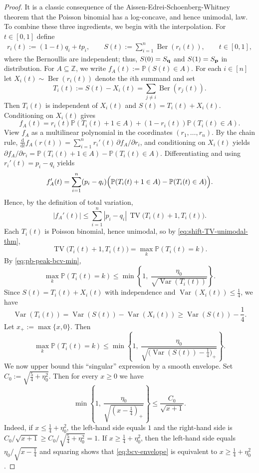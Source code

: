 \documentclass[11pt]{amsart}
\theoremstyle{plain}
\theoremstyle{definition}
\DeclareMathOperator{\TV}{TV}
\DeclareMathOperator{\Ber}{Ber}
\DeclareMathOperator{\Var}{Var}
\renewcommand{\P}{\mathbb{P}}
\newcommand{\beq}{\begin{eqnarray*}}
\newcommand{\eeq}{\end{eqnarray*}}
\newcommand{\etaBCV}{\eta_0}
\newcommand{\CBCV}{C_0}
\renewcommand{\vec}[1]{\textup{{\bf #1}}}
\begin{document}
\begin{proof}
It is a classic
consequence of
the Aissen-Edrei-Schoenberg-Whitney
theorem \cite[Section 4]{TangTang2023}
that the Poisson binomial
has a log-concave,
and hence unimodal, law.
To combine these three ingredients, we begin with the interpolation.
For $t\in[0,1]$ define
\beq
r_i(t):=(1-t)q_i+tp_i,
\qquad
S(t):=\sum_{i=1}^n \Ber(r_i(t)),
\qquad t\in[0,1],
\eeq
where the Bernoullis are independent;
thus, $S(0)=S_{\vec{q}}$ and $S(1)=S_{\vec{p}}$ in distribution.
For $A\subseteq\mathbb Z$,
we write $f_A(t):=\P(S(t)\in A)$.
For each $i\in[n]$ let $X_i(t)\sim\Ber(r_i(t))$ denote the $i$th summand and set
\[
T_i(t):=S(t)-X_i(t)=\sum_{j\ne i}\Ber(r_j(t)).
\]
Then $T_i(t)$ is independent of $X_i(t)$ and $S(t)=T_i(t)+X_i(t)$.
Conditioning on $X_i(t)$ gives
\[
f_A(t)=r_i(t)\P(T_i(t)+1\in A)+(1-r_i(t))\P(T_i(t)\in A).
\]
View $f_A$ as a multilinear polynomial in the coordinates $(r_1,\dots,r_n)$.
By the chain rule,
$\frac{\mathrm{d}}{\mathrm{d}t} f_A(r(t))=\sum_{i=1}^n r_i'(t)\,\partial f_A/\partial r_i$,
and conditioning on $X_i(t)$ yields
$\partial f_A/\partial r_i=\P(T_i(t)+1\in A)-\P(T_i(t)\in A)$.
Differentiating and using $r_i'(t)=p_i-q_i$ yields
\[
f_A'(t)=\sum_{i=1}^n (p_i-q_i)\Bigl(\P(T_i(t)+1\in A)-\P(T_i(t)\in A)\Bigr).
\]
Hence, by the definition of total variation,
\[
|f_A'(t)|
\le
\sum_{i=1}^n |p_i-q_i|\,
\TV\!\bigl(T_i(t)+1,T_i(t)\bigr)
.
\]
Each $T_i(t)$ is Poisson binomial, hence unimodal, so by
\eqref{eq:shift-TV-unimodal-thm},
\[
\TV\!\bigl(T_i(t)+1,T_i(t)\bigr)
=\max_k \P(T_i(t)=k).
\]
By \eqref{eq:pb-peak-bcv-min},
\[
\max_k \P(T_i(t)=k)
\le
\min\!\left\{1,\ \frac{\etaBCV}{\sqrt{\Var(T_i(t))}}\right\}.
\]
Since $S(t)=T_i(t)+X_i(t)$ with independence and $\Var(X_i(t))\le \tfrac14$, we have
\[
\Var(T_i(t))=\Var(S(t))-\Var(X_i(t))\ge \Var(S(t))-\frac14.
\]
Let $x_+:=\max\{x,0\}$. Then
\[
\max_k \P(T_i(t)=k)
\le
\min\!\left\{1,\ \frac{\etaBCV}{\sqrt{\bigl(\Var(S(t))-\frac14\bigr)_+}}\right\}.
\]
We now upper bound this ``singular'' expression by a smooth envelope.
Set $\CBCV:=\sqrt{\tfrac54+\etaBCV^2}$. Then for every $x\ge0$ we have
\begin{equation}\label{eq:bcv-envelope}
\min\!\left\{1,\ \frac{\etaBCV}{\sqrt{(x-\frac14)_+}}\right\}
\le
\frac{\CBCV}{\sqrt{x+1}}.
\end{equation}
Indeed, if $x\le \tfrac14+\etaBCV^2$, the left-hand side equals $1$ and the right-hand side is
$\CBCV/\sqrt{x+1}\ge \CBCV/\sqrt{\tfrac54+\etaBCV^2}=1$.
If $x\ge \tfrac14+\etaBCV^2$, then the left-hand side equals $\etaBCV/\sqrt{x-\tfrac14}$ and
squaring shows that \eqref{eq:bcv-envelope} is equivalent to $x\ge \tfrac14+\etaBCV^2$.

\end{proof}
\end{document}
